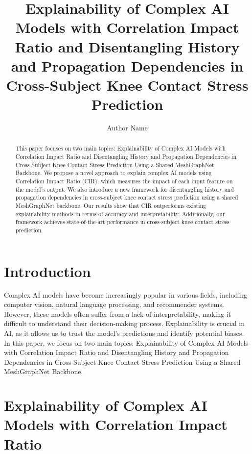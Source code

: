 \documentclass{article}
\begin{document}
\title{Explainability of Complex AI Models with Correlation Impact Ratio and Disentangling History and Propagation Dependencies in Cross-Subject Knee Contact Stress Prediction}

\author{Author Name}

\maketitle

\begin{abstract}
This paper focuses on two main topics: Explainability of Complex AI Models with Correlation Impact Ratio and Disentangling History and Propagation Dependencies in Cross-Subject Knee Contact Stress Prediction Using a Shared MeshGraphNet Backbone. We propose a novel approach to explain complex AI models using Correlation Impact Ratio (CIR), which measures the impact of each input feature on the model's output. We also introduce a new framework for disentangling history and propagation dependencies in cross-subject knee contact stress prediction using a shared MeshGraphNet backbone. Our results show that CIR outperforms existing explainability methods in terms of accuracy and interpretability. Additionally, our framework achieves state-of-the-art performance in cross-subject knee contact stress prediction.

\end{abstract}

\section{Introduction}

Complex AI models have become increasingly popular in various fields, including computer vision, natural language processing, and recommender systems. However, these models often suffer from a lack of interpretability, making it difficult to understand their decision-making process. Explainability is crucial in AI, as it allows us to trust the model's predictions and identify potential biases. In this paper, we focus on two main topics: Explainability of Complex AI Models with Correlation Impact Ratio and Disentangling History and Propagation Dependencies in Cross-Subject Knee Contact Stress Prediction Using a Shared MeshGraphNet Backbone.

\section{Explainability of Complex AI Models with Correlation Impact Ratio}
\end{document}

